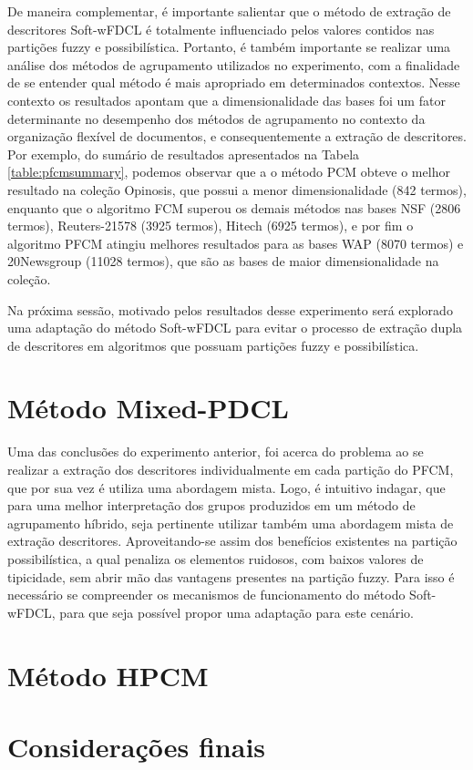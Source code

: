 De maneira complementar, é importante salientar que o método de extração de descritores Soft-wFDCL é
totalmente influenciado pelos valores contidos nas partições fuzzy e possibilística. Portanto, é
também importante se realizar uma análise dos métodos de agrupamento utilizados no experimento, com
a finalidade de se entender qual método é mais apropriado em determinados contextos. Nesse contexto
os resultados apontam que a dimensionalidade das bases foi um fator determinante no desempenho dos
métodos de agrupamento no contexto da organização flexível de documentos, e consequentemente a
extração de descritores. Por exemplo, do sumário de resultados apresentados na Tabela
\ref{table:pfcmsummary}, podemos observar que a o método PCM obteve o melhor resultado na coleção
Opinosis, que possui a menor dimensionalidade (842 termos), enquanto que o algoritmo FCM superou os
demais métodos nas bases NSF (2806 termos), Reuters-21578 (3925 termos), Hitech (6925 termos), e por
fim o algoritmo PFCM atingiu melhores resultados para as bases WAP (8070 termos) e 20Newsgroup
(11028 termos), que são as bases de maior dimensionalidade na coleção.

Na próxima sessão, motivado pelos resultados desse experimento será explorado uma adaptação do
método Soft-wFDCL para evitar o processo de extração dupla de descritores em algoritmos que possuam
partições fuzzy e possibilística.

\section{Método Mixed-PDCL}

Uma das conclusões do experimento anterior, foi acerca do problema ao se realizar a extração dos
descritores individualmente em cada partição do PFCM, que por sua vez é utiliza uma abordagem mista.
Logo, é intuitivo indagar, que para uma melhor interpretação dos grupos produzidos em um método de
agrupamento híbrido, seja pertinente utilizar também uma abordagem mista de extração descritores.
Aproveitando-se assim dos benefícios existentes na partição possibilística, a qual penaliza os
elementos ruidosos, com baixos valores de tipicidade, sem abrir mão das vantagens presentes na
partição fuzzy. Para isso é necessário se compreender os mecanismos de funcionamento do método
Soft-wFDCL, para que seja possível propor uma adaptação para este cenário.

\section{Método HPCM}
\section{Considerações finais}
